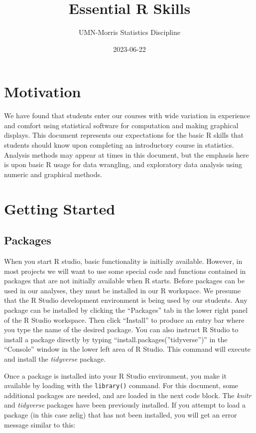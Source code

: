 \documentclass[
]{book}
\title{Essential R Skills}
\author{UMN-Morris Statistics Discipline}
\date{2023-06-22}
\begin{document}
\maketitle

{
\setcounter{tocdepth}{1}
\tableofcontents
}
\hypertarget{motivation}{%
\chapter{Motivation}\label{motivation}}

We have found that students enter our courses with wide variation in experience and comfort using statistical software for computation and making graphical displays. This document represents our expectations for the basic R skills that students should know upon completing an introductory course in statistics. Analysis methods may appear at times in this document, but the emphasis here is upon basic R usage for data wrangling, and exploratory data analysis using numeric and graphical methods.

\hypertarget{GettingStarted}{%
\chapter{Getting Started}\label{GettingStarted}}

\hypertarget{packages}{%
\section{Packages}\label{packages}}

When you start R studio, basic functionality is initially available. However, in most projects we will want to use some special code and functions contained in packages that are not initially available when R starts. Before packages can be used in our analyses, they must be installed in our R workspace. We presume that the R Studio development environment is being used by our students. Any package can be installed by clicking the ``Packages'' tab in the lower right panel of the R Studio workspace. Then click ``Install'' to produce an entry bar where you type the name of the desired package. You can also instruct R Studio to install a package directly by typing ``install.packages(''tidyverse'')'' in the ``Console'' window in the lower left area of R Studio. This command will execute and install the \emph{tidyverse} package.

Once a package is installed into your R Studio environment, you make it available by loading with the \texttt{library()} command. For this document, some additional packages are needed, and are loaded in the next code block. The \emph{knitr} and \emph{tidyverse} packages have been previously installed. If you attempt to load a package (in this case zelig) that has not been installed, you will get an error message similar to this:
\end{document}

